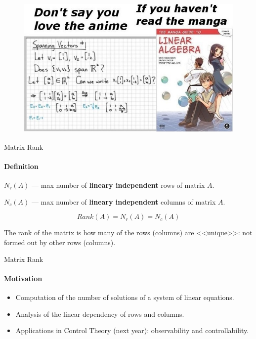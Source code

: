 \documentclass[aspectratio=169,notes]{beamer}
\begin{document}
\begin{frame}[t]{}
\framesubtitle{}
    \begin{figure}[H]
        \centering\includegraphics[height=7cm,width=1\textwidth,keepaspectratio]{agla_manga.jpeg}
        \label{fig:agla_manga.jpeg}
    \end{figure}
\end{frame}

\begin{frame}[t]{Matrix Rank}
\framesubtitle{Definition}
    \textbf{$N_r(A)$} --- max number of \textbf{lineary independent} rows of matrix $A$.

    \textbf{$N_c(A)$} --- max number of \textbf{lineary independent} columns of matrix $A$.

    \begin{equation*}
        Rank(A) = N_r(A) = N_c(A)
    \end{equation*}
\bigskip

    \centering
    The rank of the matrix is how many of the rows (columns) are <<unique>>: not formed out by other rows (columns).
\end{frame}

\begin{frame}[t]{Matrix Rank}
\framesubtitle{Motivation}
    \begin{itemize}
        \item Computation of the number of solutions of a system of linear equations.
        \item Analysis of the linear dependency of rows and columns.
        \item Applications in Control Theory (next year): observability and controllability.
    \end{itemize}
\end{frame}
\end{document}
